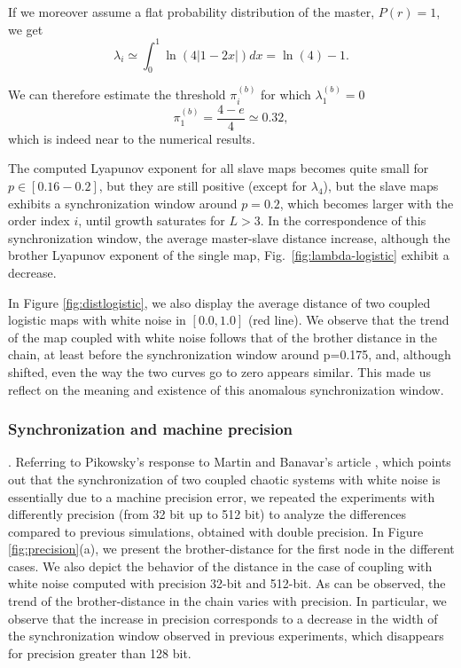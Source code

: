 \documentclass[runningheads]{llncs}
\begin{document}
If we moreover assume a flat probability distribution of the master, $P(r)=1$, we get 
\[
    \lambda_i \simeq \int_0^1 \ln\left(4|1-2x|\right) dx = \ln(4)-1.
\]

We can therefore estimate the threshold $\pi_i^{(b)}$ for which $\lambda_1^{(b)}=0$
\[
    \pi_1^{(b)} = \frac{4-e}{4}\simeq 0.32,
\]
which is indeed near to the numerical results. 

The computed Lyapunov exponent for all slave maps becomes quite small for $p\in [0.16-0.2]$, but they are still positive (except for $\lambda_4$), but the slave maps exhibits a synchronization window around $p=0.2$, which becomes larger with the order index $i$, until growth saturates for $L>3$. In the correspondence of this synchronization window, the average master-slave distance increase, although the brother Lyapunov exponent of the single map, Fig.~\ref{fig:lambda-logistic} exhibit a decrease. 

In Figure \ref{fig:distlogistic}, we also display the average distance of two coupled logistic maps with white noise in $[0.0, 1.0]$ (red line).
We observe that the trend of the map coupled with white noise follows that of the brother distance in the chain, at least before the synchronization window around p=0.175, and, although shifted, even the way the two curves go to zero appears similar.
This made us reflect on the meaning and existence of this anomalous synchronization window.\\

\subsubsection{Synchronization and machine precision}.
Referring to Pikowsky's response to Martin and Banavar's article \cite{Maritan1994}, which points out that the synchronization of two coupled chaotic systems with white noise is essentially due to a machine precision error, we repeated the experiments with differently precision (from 32 bit up to 512 bit) to analyze the differences compared to previous simulations, obtained with double precision. 
In Figure \ref{fig:precision}(a), we present the brother-distance for the first node in the different cases. We also depict the behavior of the distance in the case of coupling with white noise computed with precision 32-bit and 512-bit. As can be observed, the trend of the brother-distance in the chain varies with precision. In particular, we observe that the increase in precision corresponds to a decrease in the width of the synchronization window observed in previous experiments, which disappears for precision greater than 128 bit. 
\end{document}
